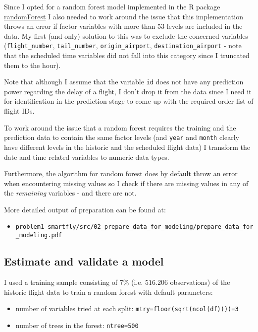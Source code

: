 \documentclass{article}\usepackage[]{graphicx}\usepackage[]{color}
\begin{document}
Since I opted for a random forest model implemented in the R package \href{http://cran.r-project.org/web/packages/randomForest/index.html}{randomForest} I also needed to work around the issue that this implementation throws an error if factor variables with more than 53 levels are included in the data. My first \textcolor{black}{(and only)} solution to this was to exclude the concerned variables (\verb+flight_number+, \verb+tail_number+, \verb+origin_airport+, \verb+destination_airport+ - note that the scheduled time variables did not fall into this category since I truncated them to the hour).

Note that although I assume that the variable \verb+id+ does not have any prediction power regarding the delay of a flight, I don't drop it from the data since I need it for identification in the prediction stage to come up with the required order list of flight IDs. 

To work around the issue that a random forest requires the training and the prediction data to contain the same factor levels (and \verb+year+ and \verb+month+ clearly have different levels in the historic and the scheduled flight data) I transform the date and time related variables to numeric data types.

Furthermore, the algorithm for random forest does by default throw an error when encountering missing values so I check if there are missing values in any of the \textit{remaining} variables - and there are not.

More detailed output of preparation can be found at:
\begin{itemize}
	\item \verb+problem1_smartfly/src/02_prepare_data_for_modeling/prepare_data_for_modeling.pdf+
\end{itemize}



\subsection{Estimate and validate a model} %
\label{sub:estimate_and_validate_a_model}

I used a training sample consisting of $7\%$ (i.e. $516.206$ observations) of the historic flight data to train a random forest with default parameters:
\begin{itemize}
	\item number of variables tried at each split: \verb+mtry=floor(sqrt(ncol(df))))=3+ 
	\item number of trees in the forest: \verb+ntree=500+
\end{itemize}
\end{document}
